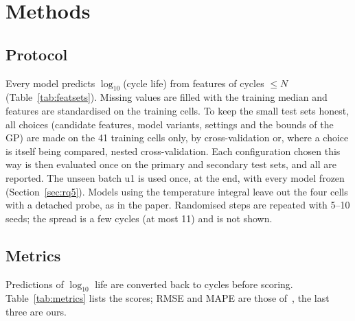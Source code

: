 \section{Methods}
\label{sec:methods}

\subsection{Protocol}
Every model predicts $\log_{10}$(cycle life) from features of cycles $\le N$
(Table~\ref{tab:featsets}). Missing values are filled with the training
median and features are standardised on the training cells. To keep the
small test sets honest, all choices (candidate features, model variants,
settings and the bounds of the GP) are made on the 41 training cells only,
by cross-validation or, where a choice is itself being compared, nested
cross-validation. Each configuration chosen this way is then evaluated once
on the primary and secondary test sets, and all are reported. The unseen
batch u1 is used once, at the end, with every model frozen
(Section~\ref{sec:rq5}). Models using the
temperature integral leave out the four cells with a detached probe, as in
the paper. Randomised steps are repeated with 5--10 seeds; the spread is a few
cycles (at most 11) and is not shown.

\subsection{Metrics}
Predictions of $\log_{10}$ life are converted back to cycles before
scoring. Table~\ref{tab:metrics} lists the scores; RMSE and MAPE are those
of~\cite{severson2019}, the last three are ours.

